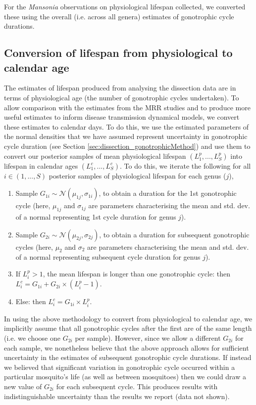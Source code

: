 \documentclass[12pt]{article}
\begin{document}
{For the \textit{Mansonia} observations on physiological lifespan collected, we converted these using the overall (i.e. across all genera) estimates of gonotrophic cycle durations.

\subsection{Conversion of lifespan from physiological to calendar age}\label{sec:dissection_conversion}
The estimates of lifespan produced from analysing the dissection data are in terms of physiological age (the number of gonotrophic cycles undertaken). To allow comparison with the estimates from the MRR studies and to produce more useful estimates to inform disease transmission dynamical models, we convert these estimates to calendar days. To do this, we use the estimated parameters of the normal densities that we have assumed represent uncertainty in gonotrophic cycle duration (see Section \ref{sec:dissection_gonotrophicMethod}) and use them to convert our posterior samples of mean physiological lifespan $(L^p_1,...,L^p_S)$ into lifespan in calendar ages $(L^c_1,...,L^c_S)$. To do this, we iterate the following for all $i\in (1,...,S)$ posterior samples of physiological lifespan for each genus ($j$),

\begin{enumerate}
	\item Sample $G_{1i} \sim \mathcal{N}(\mu_{1j},\sigma_{1i})$, to obtain a duration for the 1st gonotrophic cycle (here, $\mu_{1j}$ and $\sigma_{1j}$ are parameters characterising the mean and std. dev. of a normal representing 1st cycle duration for genus $j$).
	\item Sample $G_{2i} \sim \mathcal{N}(\mu_{2j},\sigma_{2j})$, to obtain a duration for subsequent gonotrophic cycles (here, $\mu_2$ and $\sigma_2$ are parameters characterising the mean and std. dev. of a normal representing subsequent cycle duration for genus $j$).
	\item If $L^p_i > 1$, the mean lifespan is longer than one gonotrophic cycle:
	\subitem then $L^c_i = G_{1i} + G_{2i} \times (L^p_i - 1)$.
	\item Else:
	\subitem then $L^c_i = G_{1i}\times L^p_i$.
\end{enumerate}

In using the above methodology to convert from physiological to calendar age, we implicitly assume that all gonotrophic cycles after the first are of the same length (i.e. we choose one $G_{2i}$ per sample). However, since we allow a different $G_{2i}$ for each sample, we nonetheless believe that the above approach allows for sufficient uncertainty in the estimates of subsequent gonotrophic cycle durations. If instead we believed that significant variation in gonotrophic cycle occurred within a particular mosquito's life (as well as between mosquitoes) then we could draw a new value of $G_{2i}$ for each subsequent cycle. This produces results with indistinguishable uncertainty than the results we report (data not shown).

}
\end{document}
